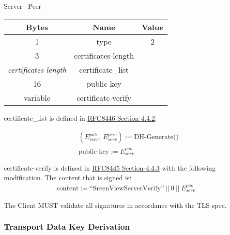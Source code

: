 \documentclass{article}
\begin{document}
    \begin{center}
        Server \textrightarrow\ Peer\\
        \begin{tabular}{|c|c|c|}
            \hline
            \textbf{Bytes}             & \textbf{Name}       & \textbf{Value} \\
            \hline
            1                          & type                & 2              \\
            \hline
            3                          & certificates-length &                \\
            \hline
            \emph{certificates-length} & certificate\_list   &                \\
            \hline
            16                         & public-key          &                \\
            \hline
            variable                   & certificate-verify  &                \\
            \hline
        \end{tabular}
    \end{center}

    certificate\_list is defined in \href{https://datatracker.ietf.org/doc/html/rfc8446#section-4.4.2}{RFC8446
    Section-4.4.2}.

    \begin{align*}
        & (E_{serv}^{pub},\, E_{serv}^{priv}) := \text{DH-Generate()}\\
        & \text{public-key} := E_{serv}^{pub}
    \end{align*}

    certificate-verify is defined in \href{https://datatracker.ietf.org/doc/html/rfc8446#section-4.4
.3}{RFC8445 Section-4.4.3} with the following modification. The content that is signed is:\\

    \begin{align*}
        \text{content} := \text{``SreenViewServerVerify''}\ ||\ 0\ ||\ E_{serv}^{pub}
    \end{align*}

    The Client MUST validate all signatures in accordance with the TLS spec.

    \subsubsection{Transport Data Key Derivation}
\end{document}
